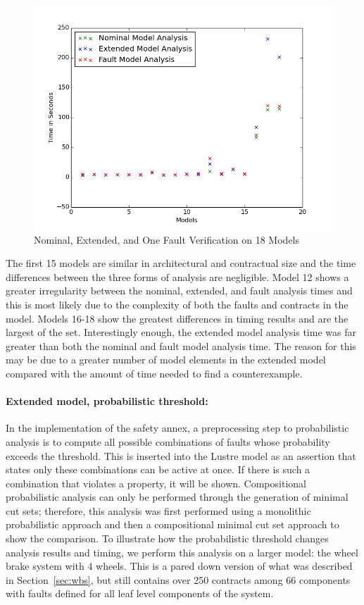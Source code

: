 \begin{figure}[htbp]
	\begin{center}
		\includegraphics[width=.7\textwidth]{images/graphComp15Models.png}
	\end{center}
	\vspace{-0.3in}
	\caption{Nominal, Extended, and One Fault Verification on 18 Models}
	\label{fig:graphComp15Models}
\end{figure}

The first 15 models are similar in architectural and contractual size and the time differences between the three forms of analysis are negligible. Model 12 shows a greater irregularity between the nominal, extended, and fault analysis times and this is most likely due to the complexity of both the faults and contracts in the model. Models 16-18 show the greatest differences in timing results and are the largest of the set. Interestingly enough, the extended model analysis time was far greater than both the nominal and fault model analysis time. The reason for this may be due to a greater number of model elements in the extended model compared with the amount of time needed to find a counterexample. 

\paragraph{Extended model, probabilistic threshold:} In the implementation of the safety annex, a preprocessing step to probabilistic analysis is to compute all possible combinations of faults whose probability exceeds the threshold. This is inserted into the Lustre model as an assertion that states only these combinations can be active at once. If there is such a combination that violates a property, it will be shown. Compositional probabilistic analysis can only be performed through the generation of minimal cut sets; therefore, this analysis was first performed using a monolithic probabilistic approach and then a compositional minimal cut set approach to show the comparison. To illustrate how the probabilistic threshold changes analysis results and timing, we perform this analysis on a larger model: the wheel brake system with 4 wheels. This is a pared down version of what was described in Section~\ref{sec:wbs}, but still contains over 250 contracts among 66 components with faults defined for all leaf level components of the system. 

